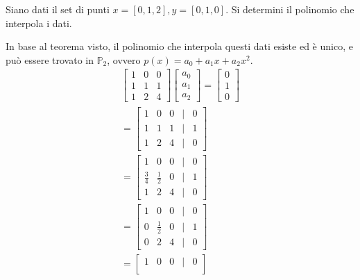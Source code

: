 \documentclass{article}
\begin{document}
\begin{example}
    Siano dati il set di punti $x=[0,1,2],y=[0,1,0]$. Si determini il polinomio
    che interpola i dati.

    In base al teorema visto, il polinomio che interpola questi dati esiste ed
    è unico, e può essere trovato in $\mathbb{P}_2$, ovvero
    $p(x)=a_0+a_1x+a_2x^2$.
    \begin{equation*}
       \begin{aligned}
           \begin{bmatrix}
               1 & 0 & 0 \\ 
               1 & 1 & 1 \\ 
               1 & 2 & 4
           \end{bmatrix}
           \begin{bmatrix}
               a_0 \\ 
               a_1 \\ 
               a_2 
           \end{bmatrix}= 
           \begin{bmatrix}
               0 \\ 
               1 \\ 
               0
           \end{bmatrix} \\
           =\begin{bmatrix}
               1 & 0 & 0 & | & 0\\ 
               1 & 1 & 1 & | & 1\\ 
               1 & 2 & 4 & | & 0
           \end{bmatrix}\\
           =\begin{bmatrix}
               1 & 0 & 0 & | & 0\\ 
               \frac{3}{4} & \frac{1}{2} & 0 & | & 1\\ 
               1 & 2 & 4 & | & 0
           \end{bmatrix}\\
           =\begin{bmatrix}
               1 & 0 & 0 & | & 0\\ 
               0 & \frac{1}{2} & 0 & | & 1\\ 
               0 & 2 & 4 & | & 0
           \end{bmatrix}\\
           =\begin{bmatrix}
               1 & 0 & 0 & | & 0\\ 

\end{bmatrix}
\end{aligned}
\end{equation*}
\end{example}
\end{document}
